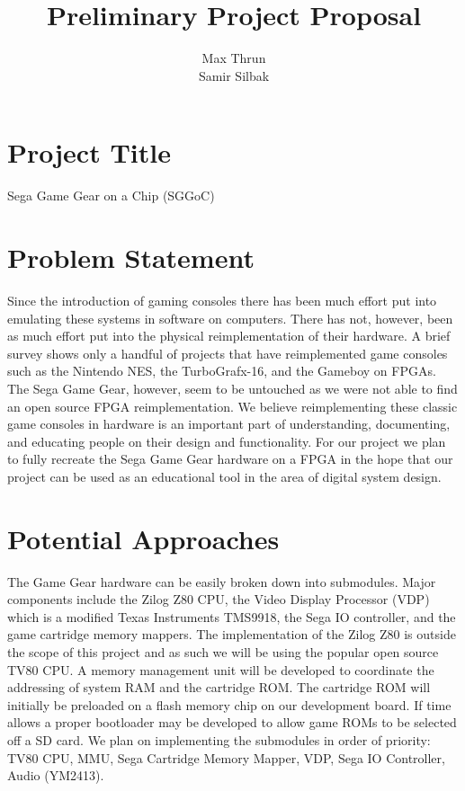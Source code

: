 \documentclass[12pt]{article}
\title{Preliminary Project Proposal}
\author{ Max Thrun \\ Samir Silbak }
\begin{document}
\maketitle

\section*{Project Title}
Sega Game Gear on a Chip (SGGoC)

\section*{Problem Statement}
Since the introduction of gaming consoles there has been
much effort put into emulating these systems in software on computers. 
There has not, however, been as much effort put into the physical reimplementation of their hardware.
A brief survey shows only a handful of projects that have reimplemented game consoles such as the Nintendo NES, 
the TurboGrafx-16, and the Gameboy on FPGAs. The Sega Game Gear, however, seem to be untouched as we were not
able to find an open source FPGA reimplementation. We believe reimplementing these classic game consoles in hardware
is an important part of understanding, documenting, and educating people on their design and functionality. 
For our project we plan to fully recreate the Sega Game Gear hardware on a FPGA in the hope that our project
can be used as an educational tool in the area of digital system design.

\section*{Potential Approaches}
The Game Gear hardware can be easily broken down into submodules. Major components include the Zilog Z80 CPU, 
the Video Display Processor (VDP) which is a modified Texas Instruments TMS9918, the Sega IO controller, and the
game cartridge memory mappers. The implementation of the Zilog Z80 is outside the scope of this project and as such
we will be using the popular open source TV80 CPU. A memory management unit will be developed to coordinate the 
addressing of system RAM and the cartridge ROM. The cartridge ROM will initially be preloaded on a flash memory chip on
our development board. If time allows a proper bootloader may be developed to allow game ROMs to be selected off a
SD card. We plan on implementing the submodules in order of priority: TV80 CPU, MMU, Sega Cartridge Memory Mapper, VDP,
Sega IO Controller, Audio (YM2413).
\end{document}
